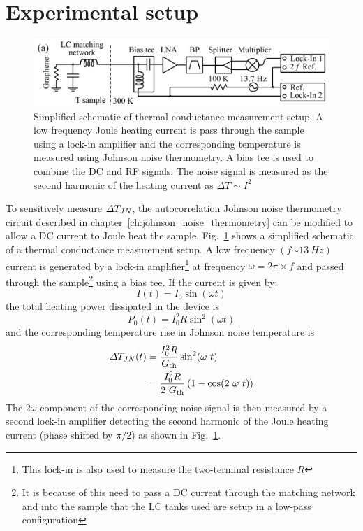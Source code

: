 \section{Experimental setup}
\begin{figure}
\centering
\includegraphics[width=130mm]{figures/thermal_via_noise/Schematic_Joule_heating.png}
\caption{Simplified schematic of thermal conductance measurement setup. A low frequency Joule heating current is pass through the sample using a lock-in amplifier and the corresponding temperature is measured using Johnson noise thermometry. A bias tee is used to combine the DC and RF signals. The noise signal is measured as the second harmonic of the heating current as $\Delta T \sim I^2$}
\label{fig:schematic_Joule_heating}
\end{figure}
To sensitively measure $\Delta T_{JN}$, the autocorrelation Johnson noise thermometry circuit described in chapter~\ref{ch:johnson_noise_thermometry} can be modified to allow a DC current to Joule heat the sample. Fig.~\ref{fig:schematic_Joule_heating} shows a simplified schematic of a thermal conductance measurement setup. A low frequency $(f{\sim 13}~Hz)$ current is generated by a lock-in amplifier\footnote{This lock-in is also used to measure the two-terminal resistance $R$} at frequency $\omega = 2\pi\times f$ and passed through the sample\footnote{It is because of this need to pass a DC current through the matching network and into the sample that the LC tanks used are setup in a low-pass configuration} using a bias tee. If the current is given by:
\begin{equation}
I(t) = I_0\sin(\omega t)
\end{equation}
the total heating power dissipated in the device is
\begin{equation}
P_0(t) = I_0^2R\sin^2(\omega t)
\end{equation}
and the corresponding temperature rise in Johnson noise temperature is 
\begin{align}
\Delta T_{JN}(t) &= \frac{I_0^2R}{G_{\mathrm{th}}}\sin^2(\omega~t) \nonumber \\
&=\frac{I_0^2R}{2~G_{\mathrm{th}}}\left(1-\cos(2~\omega~t)\right)
\end{align}
The $2\omega$ component of the corresponding noise signal is then measured by a second lock-in amplifier detecting the second harmonic of the Joule heating current (phase shifted by $\pi/2$) as shown in Fig.~\ref{fig:schematic_Joule_heating}.


